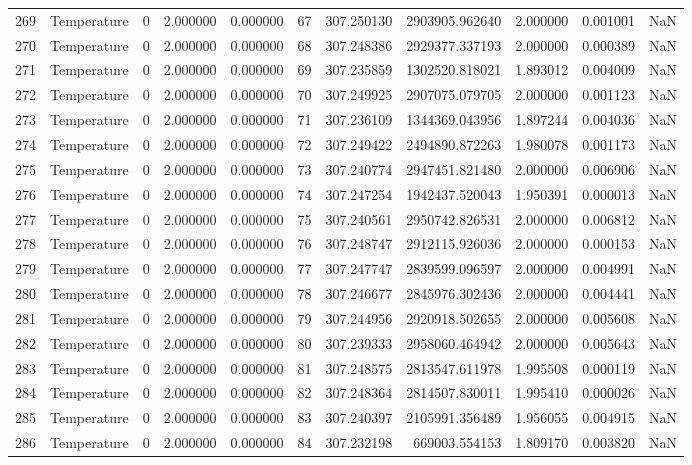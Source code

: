 \begin{tabular}{llrrrrrrrrr}
269 & Temperature & 0 & 2.000000 & 0.000000 & 67 & 307.250130 & 2903905.962640 & 2.000000 & 0.001001 & NaN \\
270 & Temperature & 0 & 2.000000 & 0.000000 & 68 & 307.248386 & 2929377.337193 & 2.000000 & 0.000389 & NaN \\
271 & Temperature & 0 & 2.000000 & 0.000000 & 69 & 307.235859 & 1302520.818021 & 1.893012 & 0.004009 & NaN \\
272 & Temperature & 0 & 2.000000 & 0.000000 & 70 & 307.249925 & 2907075.079705 & 2.000000 & 0.001123 & NaN \\
273 & Temperature & 0 & 2.000000 & 0.000000 & 71 & 307.236109 & 1344369.043956 & 1.897244 & 0.004036 & NaN \\
274 & Temperature & 0 & 2.000000 & 0.000000 & 72 & 307.249422 & 2494890.872263 & 1.980078 & 0.001173 & NaN \\
275 & Temperature & 0 & 2.000000 & 0.000000 & 73 & 307.240774 & 2947451.821480 & 2.000000 & 0.006906 & NaN \\
276 & Temperature & 0 & 2.000000 & 0.000000 & 74 & 307.247254 & 1942437.520043 & 1.950391 & 0.000013 & NaN \\
277 & Temperature & 0 & 2.000000 & 0.000000 & 75 & 307.240561 & 2950742.826531 & 2.000000 & 0.006812 & NaN \\
278 & Temperature & 0 & 2.000000 & 0.000000 & 76 & 307.248747 & 2912115.926036 & 2.000000 & 0.000153 & NaN \\
279 & Temperature & 0 & 2.000000 & 0.000000 & 77 & 307.247747 & 2839599.096597 & 2.000000 & 0.004991 & NaN \\
280 & Temperature & 0 & 2.000000 & 0.000000 & 78 & 307.246677 & 2845976.302436 & 2.000000 & 0.004441 & NaN \\
281 & Temperature & 0 & 2.000000 & 0.000000 & 79 & 307.244956 & 2920918.502655 & 2.000000 & 0.005608 & NaN \\
282 & Temperature & 0 & 2.000000 & 0.000000 & 80 & 307.239333 & 2958060.464942 & 2.000000 & 0.005643 & NaN \\
283 & Temperature & 0 & 2.000000 & 0.000000 & 81 & 307.248575 & 2813547.611978 & 1.995508 & 0.000119 & NaN \\
284 & Temperature & 0 & 2.000000 & 0.000000 & 82 & 307.248364 & 2814507.830011 & 1.995410 & 0.000026 & NaN \\
285 & Temperature & 0 & 2.000000 & 0.000000 & 83 & 307.240397 & 2105991.356489 & 1.956055 & 0.004915 & NaN \\
286 & Temperature & 0 & 2.000000 & 0.000000 & 84 & 307.232198 & 669003.554153 & 1.809170 & 0.003820 & NaN \\

\end{tabular}
